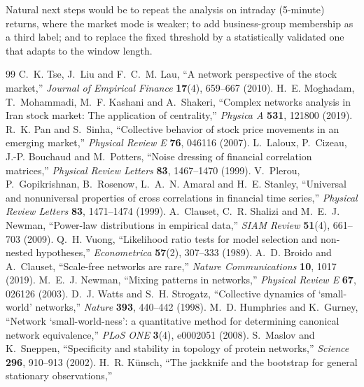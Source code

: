 \documentclass[11pt,a4paper]{article}
\begin{document}
Natural next steps would be to repeat the analysis on intraday (5-minute) returns, where the market mode is weaker; to
add business-group membership as a third label; and to replace the fixed threshold by a statistically validated one that
adapts to the window length.

\begin{thebibliography}{99}\small
{} C.~K. Tse, J.~Liu and F.~C.~M. Lau, ``A network perspective of the stock market,''
  \emph{Journal of Empirical Finance} \textbf{17}(4), 659--667 (2010).
 H.~E. Moghadam, T.~Mohammadi, M.~F. Kashani and A.~Shakeri, ``Complex networks analysis in Iran
  stock market: The application of centrality,'' \emph{Physica A} \textbf{531}, 121800 (2019).
 R.~K. Pan and S.~Sinha, ``Collective behavior of stock price movements in an emerging market,''
  \emph{Physical Review E} \textbf{76}, 046116 (2007).
 L.~Laloux, P.~Cizeau, J.-P. Bouchaud and M.~Potters, ``Noise dressing of financial correlation
  matrices,'' \emph{Physical Review Letters} \textbf{83}, 1467--1470 (1999).
 V.~Plerou, P.~Gopikrishnan, B.~Rosenow, L.~A.~N. Amaral and H.~E. Stanley, ``Universal and
  nonuniversal properties of cross correlations in financial time series,'' \emph{Physical Review Letters}
  \textbf{83}, 1471--1474 (1999).
 A.~Clauset, C.~R. Shalizi and M.~E.~J. Newman, ``Power-law distributions in empirical data,''
  \emph{SIAM Review} \textbf{51}(4), 661--703 (2009).
 Q.~H. Vuong, ``Likelihood ratio tests for model selection and non-nested hypotheses,''
  \emph{Econometrica} \textbf{57}(2), 307--333 (1989).
 A.~D. Broido and A.~Clauset, ``Scale-free networks are rare,'' \emph{Nature Communications}
  \textbf{10}, 1017 (2019).
 M.~E.~J. Newman, ``Mixing patterns in networks,'' \emph{Physical Review E} \textbf{67}, 026126 (2003).
 D.~J. Watts and S.~H. Strogatz, ``Collective dynamics of `small-world' networks,'' \emph{Nature}
  \textbf{393}, 440--442 (1998).
 M.~D. Humphries and K.~Gurney, ``Network `small-world-ness': a quantitative method for
  determining canonical network equivalence,'' \emph{PLoS ONE} \textbf{3}(4), e0002051 (2008).
 S.~Maslov and K.~Sneppen, ``Specificity and stability in topology of protein networks,''
  \emph{Science} \textbf{296}, 910--913 (2002).
 H.~R. K\"unsch, ``The jackknife and the bootstrap for general stationary observations,''

\end{thebibliography}
\end{document}
